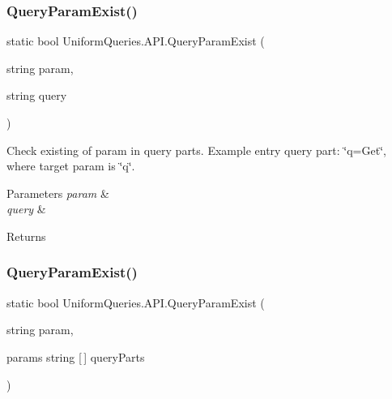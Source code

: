 \subsubsection{\texorpdfstring{Query\+Param\+Exist()}{QueryParamExist()}\hspace{0.1cm}{\footnotesize\ttfamily [1/3]}}
{\footnotesize\ttfamily static bool Uniform\+Queries.\+A\+P\+I.\+Query\+Param\+Exist (\begin{DoxyParamCaption}\item[{string}]{param,  }\item[{string}]{query }\end{DoxyParamCaption})\hspace{0.3cm}{\ttfamily [static]}}



Check existing of param in query parts. Example entry query part\+: \char`\"{}q=\+Get\char`\"{}, where target param is \char`\"{}q\char`\"{}. 


\begin{DoxyParams}{Parameters}
{\em param} & \\
\hline
{\em query} & \\
\hline
\end{DoxyParams}
\begin{DoxyReturn}{Returns}

\end{DoxyReturn}
\mbox{\label{class_uniform_queries_1_1_a_p_i_a0f6c53ca64000015c8bf7bed30d9c57a}} 
\subsubsection{\texorpdfstring{Query\+Param\+Exist()}{QueryParamExist()}\hspace{0.1cm}{\footnotesize\ttfamily [2/3]}}
{\footnotesize\ttfamily static bool Uniform\+Queries.\+A\+P\+I.\+Query\+Param\+Exist (\begin{DoxyParamCaption}\item[{string}]{param,  }\item[{params string \mbox{[}$\,$\mbox{]}}]{query\+Parts }\end{DoxyParamCaption})\hspace{0.3cm}{\ttfamily [static]}}



